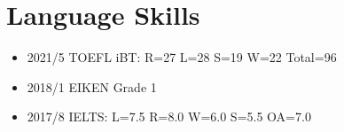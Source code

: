 \documentclass{article}
\begin{document}
\section*{Language Skills}
  \begin{itemize}
    \item 2021/5 TOEFL iBT: R=27 L=28 S=19 W=22 Total=96
    \item 2018/1 EIKEN Grade 1
    \item 2017/8 IELTS: L=7.5 R=8.0 W=6.0 S=5.5 OA=7.0
  \end{itemize}
\end{document}
